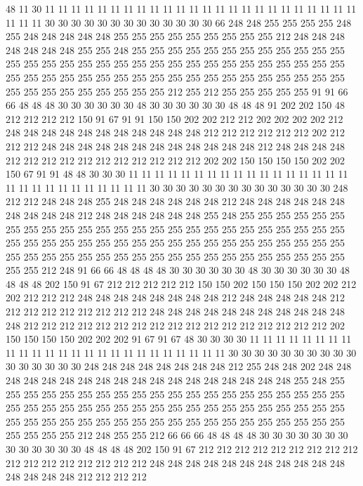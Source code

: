 48 11 30 11 11 11 11 11 11 11 11 11 11 11 11 11 11 11 11 11
11 11 11 11 11 11 11 11 11 11 30 30 30 30 30 30 30 30 30 30
30 30 30 66 248 248 255 255 255 255 248 255 248 248 248 248 248 255 255 255
255 255 255 255 255 255 212 248 248 248 248 248 248 248 255 255 248 255 255 255
255 255 255 255 255 255 255 255 255 255 255 255 255 255 255 255 255 255 255 255
255 255 255 255 255 255 255 255 255 255 255 255 255 255 255 255 255 255 255 255
255 255 255 255 255 255 255 255 255 255 255 255 255 255 255 255 212 255 212 255
255 255 255 255 91 91 66 66 48 48 48 30 30 30 30 30 30 48 30 30
30 30 30 30 48 48 48 91 202 202 150 48 212 212 212 212 150 91 67 91
91 150 150 202 202 212 212 202 202 202 202 212 248 248 248 248 248 248 248 248
248 248 248 212 212 212 212 212 212 202 212 212 212 248 248 248 248 248 248 248
248 248 248 248 248 212 248 248 248 248 212 212 212 212 212 212 212 212 212 212
212 202 202 150 150 150 150 202 202 150 67 91 91 48 48 30 30 30 11 11
11 11 11 11 11 11 11 11 11 11 11 11 11 11 11 11 11 11 11 11
11 11 11 11 11 11 30 30 30 30 30 30 30 30 30 30 30 30 30 30
248 212 212 248 248 248 255 248 248 248 248 248 248 212 248 248 248 248 248 248
248 248 248 248 212 248 248 248 248 248 248 255 248 255 255 255 255 255 255 255
255 255 255 255 255 255 255 255 255 255 255 255 255 255 255 255 255 255 255 255
255 255 255 255 255 255 255 255 255 255 255 255 255 255 255 255 255 255 255 255
255 255 255 255 255 255 255 255 255 255 255 255 255 255 255 255 255 255 212 248
91 66 66 48 48 48 48 30 30 30 30 30 30 48 30 30 30 30 30 30
48 48 48 48 202 150 91 67 212 212 212 212 212 150 150 202 150 150 150 202
202 212 202 212 212 212 248 248 248 248 248 248 248 248 212 248 248 248 248 248
212 212 212 212 212 212 212 212 212 248 248 248 248 248 248 248 248 248 248 248
248 212 212 212 212 212 212 212 212 212 212 212 212 212 212 212 212 212 202 150
150 150 150 202 202 202 91 67 91 67 48 30 30 30 30 11 11 11 11 11
11 11 11 11 11 11 11 11 11 11 11 11 11 11 11 11 11 11 11 11
30 30 30 30 30 30 30 30 30 30 30 30 30 30 30 30 248 248 248 248
248 248 248 248 212 255 248 248 202 248 248 248 248 248 248 248 248 248 248 248
248 248 248 248 248 248 248 255 248 255 255 255 255 255 255 255 255 255 255 255
255 255 255 255 255 255 255 255 255 255 255 255 255 255 255 255 255 255 255 255
255 255 255 255 255 255 255 255 255 255 255 255 255 255 255 255 255 255 255 255
255 255 255 255 255 255 255 255 255 255 255 212 248 255 255 212 66 66 66 48
48 48 48 30 30 30 30 30 30 30 30 30 30 30 30 30 48 48 48 48
202 150 91 67 212 212 212 212 212 212 212 212 212 212 212 212 212 212 212 212
212 248 248 248 248 248 248 248 248 248 248 248 248 248 248 248 212 212 212 212
